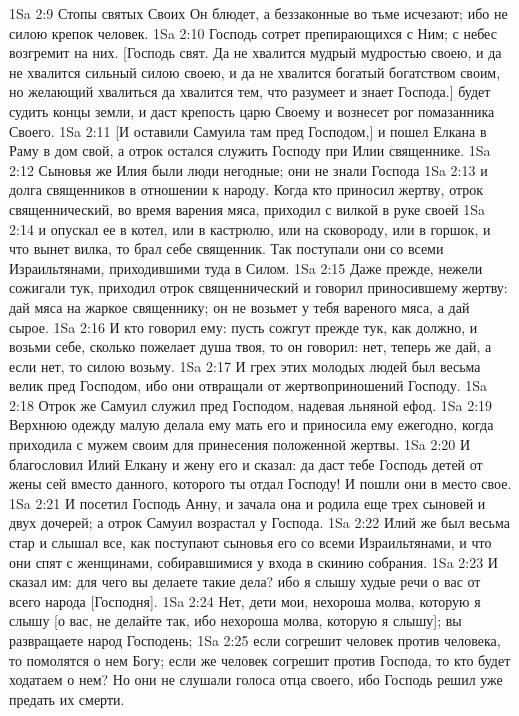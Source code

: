 \vs 1Sa 2:9 Стопы святых Своих Он блюдет, а беззаконные во тьме исчезают; ибо не силою крепок человек.
\vs 1Sa 2:10 Господь сотрет препирающихся с Ним; с небес возгремит на них. [Господь свят. Да не хвалится мудрый мудростью своею, и да не хвалится сильный силою своею, и да не хвалится богатый богатством своим, но желающий хвалиться да хвалится тем, что разумеет и знает Господа.]  будет судить концы земли, и даст крепость царю Своему и вознесет рог помазанника Своего.
\rsbpar\vs 1Sa 2:11 [И оставили Самуила там пред Господом,] и пошел Елкана в Раму в дом свой, а отрок остался служить Господу при Илии священнике.
\vs 1Sa 2:12 Сыновья же Илия были люди негодные; они не знали Господа
\vs 1Sa 2:13 и долга священников в отношении к народу. Когда кто приносил жертву, отрок священнический, во время варения мяса, приходил с вилкой в руке своей
\vs 1Sa 2:14 и опускал ее в котел, или в кастрюлю, или на сковороду, или в горшок, и что вынет вилка, то брал себе священник. Так поступали они со всеми Израильтянами, приходившими туда в Силом.
\vs 1Sa 2:15 Даже прежде, нежели сожигали тук, приходил отрок священнический и говорил приносившему жертву: дай мяса на жаркое священнику; он не возьмет у тебя вареного мяса, а дай сырое.
\vs 1Sa 2:16 И  кто говорил ему: пусть сожгут прежде тук, как должно, и  возьми себе, сколько пожелает душа твоя, то он говорил: нет, теперь же дай, а если нет, то силою возьму.
\vs 1Sa 2:17 И грех этих молодых людей был весьма велик пред Господом, ибо они отвращали от жертвоприношений Господу.
\vs 1Sa 2:18 Отрок же Самуил служил пред Господом, надевая льняной ефод.
\vs 1Sa 2:19 Верхнюю одежду малую делала ему мать его и приносила ему ежегодно, когда приходила с мужем своим для принесения положенной жертвы.
\vs 1Sa 2:20 И благословил Илий Елкану и жену его и сказал: да даст тебе Господь детей от жены сей вместо данного, которого ты отдал Господу! И пошли они в место свое.
\vs 1Sa 2:21 И посетил Господь Анну, и зачала она и родила еще трех сыновей и двух дочерей; а отрок Самуил возрастал у Господа.
\rsbpar\vs 1Sa 2:22 Илий же был весьма стар и слышал все, как поступают сыновья его со всеми Израильтянами, и что они спят с женщинами, собиравшимися у входа в скинию собрания.
\vs 1Sa 2:23 И сказал им: для чего вы делаете такие дела? ибо я слышу худые речи о вас от всего народа [Господня].
\vs 1Sa 2:24 Нет, дети мои, нехороша молва, которую я слышу [о вас, не делайте так, ибо нехороша молва, которую я слышу]; вы развращаете народ Господень;
\vs 1Sa 2:25 если согрешит человек против человека, то помолятся о нем Богу; если же человек согрешит против Господа, то кто будет ходатаем о нем? Но они не слушали голоса отца своего, ибо Господь решил уже предать их смерти.
